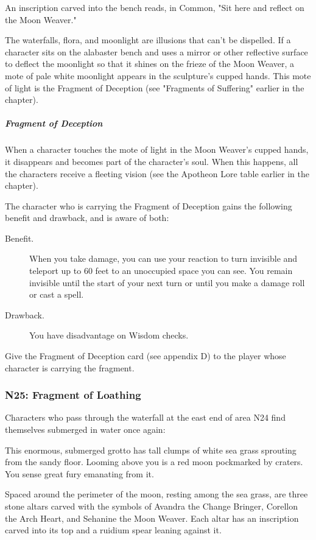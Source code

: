 \documentclass[10pt,a4paper,twoside,bg=print,twocolumn,openany,nodeprecatedcode]{dndbook}
\begin{document}
\begin{DndReadAloud}{}
An inscription carved into the bench reads, in Common, "Sit here and reflect on the Moon Weaver."

\end{DndReadAloud}

The waterfalls, flora, and moonlight are illusions that can't be dispelled. If a character sits on the alabaster bench and uses a mirror or other reflective surface to deflect the moonlight so that it shines on the frieze of the Moon Weaver, a mote of pale white moonlight appears in the sculpture's cupped hands. This mote of light is the Fragment of Deception (see "Fragments of Suffering" earlier in the chapter).

\subparagraph{Fragment of Deception}
When a character touches the mote of light in the Moon Weaver's cupped hands, it disappears and becomes part of the character's soul. When this happens, all the characters receive a fleeting vision (see the Apotheon Lore table earlier in the chapter).

The character who is carrying the Fragment of Deception gains the following benefit and drawback, and is aware of both:

\begin{DndSidebar}[float=!b]{}

\begin{description}
\item[Benefit.]
When you take damage, you can use your reaction to turn invisible and teleport up to 60 feet to an unoccupied space you can see. You remain invisible until the start of your next turn or until you make a damage roll or cast a spell.
\item[Drawback.]
You have disadvantage on Wisdom checks.
\end{description}



\end{DndSidebar}

Give the Fragment of Deception card (see appendix D) to the player whose character is carrying the fragment.

\subsubsection{N25: Fragment of Loathing}
Characters who pass through the waterfall at the east end of area N24 find themselves submerged in water once again:

\begin{DndReadAloud}{}
This enormous, submerged grotto has tall clumps of white sea grass sprouting from the sandy floor. Looming above you is a red moon pockmarked by craters. You sense great fury emanating from it.

Spaced around the perimeter of the moon, resting among the sea grass, are three stone altars carved with the symbols of Avandra the Change Bringer, Corellon the Arch Heart, and Sehanine the Moon Weaver. Each altar has an inscription carved into its top and a ruidium spear leaning against it.

\end{DndReadAloud}
\end{document}
